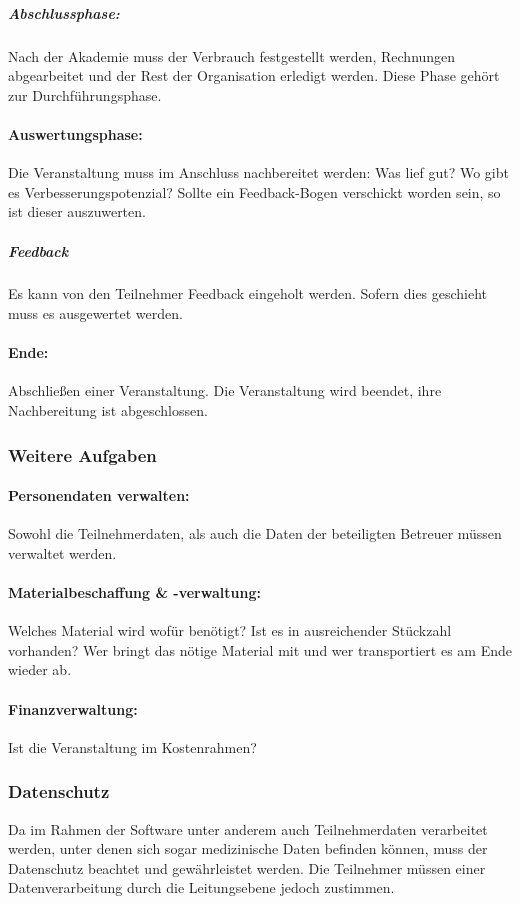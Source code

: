 \documentclass[a4paper]{scrartcl}
\begin{document}
	\subparagraph{Abschlussphase:}
	Nach der Akademie muss der Verbrauch festgestellt werden, Rechnungen abgearbeitet und der Rest der Organisation erledigt werden. Diese Phase gehört zur Durchführungsphase.
	
	\paragraph{Auswertungsphase:}
	Die Veranstaltung muss im Anschluss nachbereitet werden: Was lief gut? Wo gibt es Verbesserungspotenzial? Sollte ein Feedback-Bogen verschickt worden sein, so ist dieser auszuwerten.
	
	\subparagraph{Feedback}
	Es kann von den Teilnehmer Feedback eingeholt werden. Sofern dies geschieht muss es ausgewertet werden.
	
	\paragraph{Ende:}
	Abschließen einer Veranstaltung. Die Veranstaltung wird beendet, ihre Nachbereitung ist abgeschlossen.
	
	\subsubsection{Weitere Aufgaben}
	
	\paragraph{Personendaten verwalten:}
	Sowohl die Teilnehmerdaten, als auch die Daten der beteiligten Betreuer müssen verwaltet werden.
	
	\paragraph{Materialbeschaffung \& -verwaltung:}
	Welches Material wird wofür benötigt? Ist es in ausreichender Stückzahl vorhanden? Wer bringt das nötige Material mit und wer transportiert es am Ende wieder ab.
	
	\paragraph{Finanzverwaltung:}
	Ist die Veranstaltung im Kostenrahmen?
	
	\subsubsection{Datenschutz}
	Da im Rahmen der Software unter anderem auch Teilnehmerdaten verarbeitet werden, unter denen sich sogar medizinische Daten befinden können, muss der Datenschutz beachtet und gewährleistet werden. Die Teilnehmer müssen einer Datenverarbeitung durch die Leitungsebene jedoch zustimmen.
	
\end{document}
